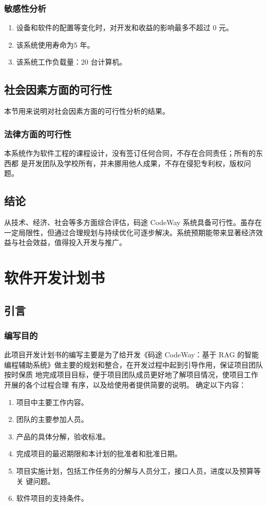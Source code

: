 \documentclass[
    report,     %
    oneside,    %
    UTF8,       %
    zihao=-4    %
]{config} %
\begin{document}
\subsection{敏感性分析}
\begin{enumerate}[label=(\arabic*)]
    \item 设备和软件的配置等变化时，对开发和收益的影响最多不超过 0 元。
    \item 该系统使用寿命为5 年。
    \item 该系统工作负载量：20 台计算机。
\end{enumerate}
\section{社会因素方面的可行性}
本节用来说明对社会因素方面的可行性分析的结果。
\subsection{法律方面的可行性}
本系统作为软件工程的课程设计，没有签订任何合同，不存在合同责任；所有的东西都
是开发团队及学校所有，并未挪用他人成果，不存在侵犯专利权，版权问题。
\section{结论}
从技术、经济、社会等多方面综合评估，码途 CodeWay 系统具备可行性。虽存在一定局限性，但通过合理规划与持续优化可逐步解决。系统预期能带来显著经济效益与社会效益，值得投入开发与推广。

\chapter{软件开发计划书}
\section{引言}
\subsection{编写目的}
此项目开发计划书的编写主要是为了给开发《码途 CodeWay：基于 RAG 的智能编程辅助系统》做主要的规划和整合，在开发过程中起到引导作用，保证项目团队按时保质
地完成项目目标，便于项目团队成员更好地了解项目情况，使项目工作开展的各个过程合理
有序，以及给使用者提供简要的说明。
确定以下内容：
\begin{enumerate}[label=(\arabic*)]
    \item 项目中主要工作内容。
    \item 团队的主要参加人员。
    \item 产品的具体分解，验收标准。
    \item 完成项目的最迟期限和本计划的批准者和批准日期。
    \item 项目实施计划，包括工作任务的分解与人员分工，接口人员，进度以及预算等关
键问题。
    \item 软件项目的支持条件。
\end{enumerate}
\end{document}
